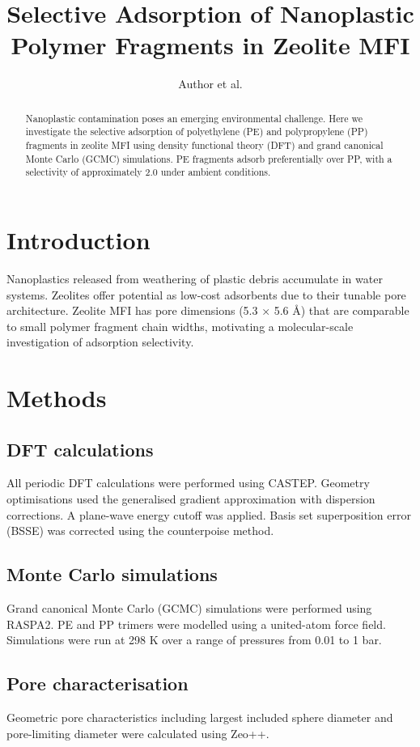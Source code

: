 \documentclass[12pt]{article}
\title{Selective Adsorption of Nanoplastic Polymer Fragments in Zeolite MFI}
\author{Author et al.}
\begin{document}
\maketitle

\begin{abstract}
Nanoplastic contamination poses an emerging environmental challenge. Here we investigate the
selective adsorption of polyethylene (PE) and polypropylene (PP) fragments in zeolite MFI using
density functional theory (DFT) and grand canonical Monte Carlo (GCMC) simulations. PE fragments
adsorb preferentially over PP, with a selectivity of approximately 2.0 under ambient conditions.
\end{abstract}

\section{Introduction}
Nanoplastics released from weathering of plastic debris accumulate in water systems.
Zeolites offer potential as low-cost adsorbents due to their tunable pore architecture.
Zeolite MFI has pore dimensions (5.3 × 5.6 Å) that are comparable to small polymer
fragment chain widths, motivating a molecular-scale investigation of adsorption selectivity.

\section{Methods}

\subsection{DFT calculations}
All periodic DFT calculations were performed using CASTEP. Geometry optimisations used the
generalised gradient approximation with dispersion corrections. A plane-wave energy cutoff was
applied. Basis set superposition error (BSSE) was corrected using the counterpoise method.

\subsection{Monte Carlo simulations}
Grand canonical Monte Carlo (GCMC) simulations were performed using RASPA2. PE and PP
trimers were modelled using a united-atom force field. Simulations were run at 298 K
over a range of pressures from 0.01 to 1 bar.

\subsection{Pore characterisation}
Geometric pore characteristics including largest included sphere diameter and pore-limiting
diameter were calculated using Zeo++.
\end{document}
